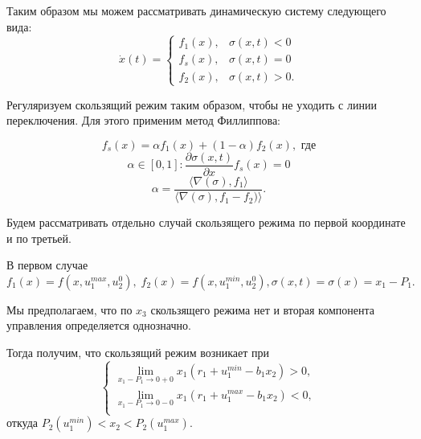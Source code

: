 \documentclass[11pt]{article}
\newcommand\dd[2]{\frac{\partial#1}{\partial#2}}
\begin{document}
Таким образом мы можем рассматривать динамическую систему следующего вида:
$$\dot x(t) = \begin{cases} f_1(x), & \sigma(x,t) < 0 \\ f_s(x), & \sigma(x,t) = 0 \\ f_2(x), & \sigma(x,t) > 0.\end{cases}$$

Регуляризуем скользящий режим таким образом, чтобы не уходить с линии переключения. Для этого применим метод Филлиппова:

$$f_s(x) = \alpha f_1(x) + (1 - \alpha) f_2(x), \text{  где}$$
$$\alpha \in [0, 1] : \dd{\sigma(x,t)}{x} f_s(x) = 0$$
$$\alpha = \frac{\langle \nabla(\sigma), f_1\rangle}{\langle \nabla(\sigma), f_1 - f_2) \rangle}.$$

Будем рассматривать отдельно случай скользящего режима по первой координате и по третьей.

В первом случае 
$f_1(x) = f(x,u_1^{max}, u_2^0), \; f_2(x) = f(x,u_1^{min}, u_2^0), \sigma(x,t) = \sigma(x) = x_1 - P_1.$

Мы предполагаем, что по $x_3$ скользящего режима нет и вторая компонента управления определяется однозначно.

Тогда получим, что скользящий режим возникает при 
$$
\left\{
\begin{aligned}
	\lim_{x_1 - P_1 \to 0 + 0} x_1(r_1 + u_1^{min} - b_1x_2) > 0, \\
	\lim_{x_1 - P_1 \to 0 - 0} x_1(r_1 + u_1^{max} - b_1x_2) < 0, \\
\end{aligned}
\right.
$$
откуда $P_2(u_1^{min}) < x_2 < P_2(u_1^{max}).$
\end{document}
